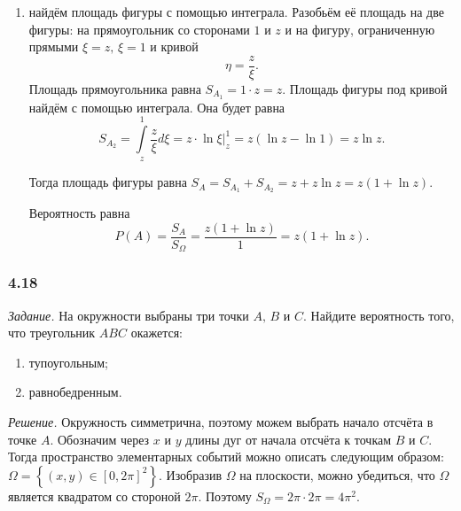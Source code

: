 \begin{enumerate}[label=\alph*)]
\item найдём площадь фигуры с помощью интеграла.
Разобьём её площадь на две фигуры: на прямоугольник со сторонами $1$ и $z$ и на фигуру, ограниченную прямыми $ \xi = z, \, \xi = 1$ и кривой
$$ \eta =
\frac{z}{ \xi }.$$
Площадь прямоугольника равна $S_{A_1} = 1 \cdot z = z$.
Площадь фигуры под кривой найдём с помощью интеграла.
Она будет равна
$$S_{A_2} =
\int \limits_{z}^1 \frac{z}{ \xi } d \xi =
\left. z \cdot \ln \xi \right|_z^1 =
z \left( \ln z - \ln 1 \right) =
z \ln z.$$

Тогда площадь фигуры равна $S_A = S_{A_1} + S_{A_2} = z + z \ln z = z \left( 1 + \ln z \right)$.

Вероятность равна
$$P \left( A \right) =
\frac{S_A}{S_{ \Omega }} =
\frac{z \left( 1 + \ln z \right) }{1} =
z \left( 1 + \ln z \right).$$
\end{enumerate}

\subsubsection*{4.18}

\textit{Задание.} На окружности выбраны три точки $A, \, B$ и $C$.
Найдите вероятность того, что треугольник $ABC$ окажется:
\begin{enumerate}[label=\alph*)]
\item тупоугольным;
\item равнобедренным.
\end{enumerate}

\textit{Решение.} Окружность симметрична, поэтому можем выбрать начало отсчёта в точке $A$.
Обозначим через $x$ и $y$ длины дуг от начала отсчёта к точкам $B$ и $C$.
Тогда пространство элементарных событий можно описать следующим образом:
$ \Omega =
\left\{  \left( x, y \right) \in \left[0, 2 \pi \right]^2 \right\}$.
Изобразив $ \Omega $ на плоскости, можно убедиться, что $ \Omega $ является квадратом со стороной $2 \pi$.
Поэтому $S_{ \Omega } = 2 \pi \cdot 2 \pi = 4 \pi^2$.

